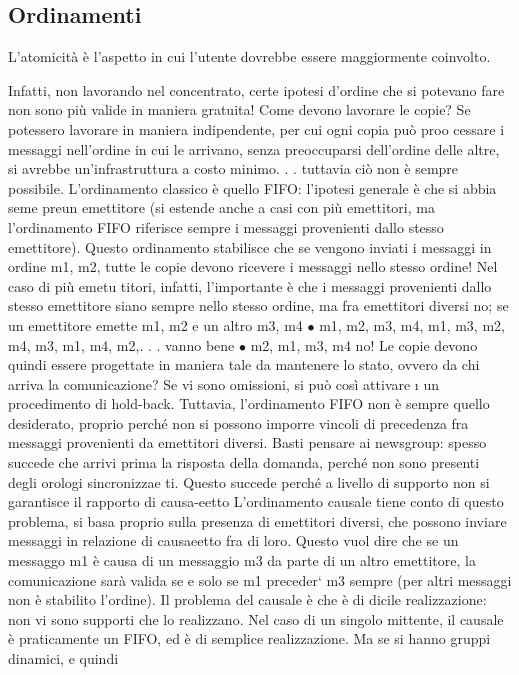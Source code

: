 \subsection{Ordinamenti}
L'atomicità è l'aspetto in cui l'utente dovrebbe essere maggiormente coinvolto.

Infatti, non lavorando nel concentrato, certe ipotesi d'ordine che si potevano
fare non sono più valide in maniera gratuita! Come devono lavorare le copie?
Se potessero lavorare in maniera indipendente, per cui ogni copia può proo
cessare i messaggi nell'ordine in cui le arrivano, senza preoccuparsi dell'ordine
delle altre, si avrebbe un'infrastruttura a costo minimo. . . tuttavia ciò non è
sempre possibile.
L'ordinamento classico è quello FIFO: l'ipotesi generale è che si abbia seme
preun emettitore (si estende anche a casi con più emettitori, ma l'ordinamento
FIFO riferisce sempre i messaggi provenienti dallo stesso emettitore). Questo
ordinamento stabilisce che se vengono inviati i messaggi in ordine m1, m2, tutte
le copie devono ricevere i messaggi nello stesso ordine! Nel caso di più emetu
titori, infatti, l'importante è che i messaggi provenienti dallo stesso emettitore
siano sempre nello stesso ordine, ma fra emettitori diversi no; se un emettitore
emette m1, m2 e un altro m3, m4
$\bullet$ m1, m2, m3, m4, m1, m3, m2, m4, m3, m1, m4, m2,. . . vanno bene
$\bullet$ m2, m1, m3, m4 no!
Le copie devono quindi essere progettate in maniera tale da mantenere lo stato,
ovvero da chi arriva la comunicazione? Se vi sono omissioni, si può così attivare
\i{}
un procedimento di hold-back.
Tuttavia, l'ordinamento FIFO non è sempre quello desiderato, proprio perché
non si possono imporre vincoli di precedenza fra messaggi provenienti da emettitori diversi. Basti pensare ai newsgroup:
spesso succede che arrivi prima
la risposta della domanda, perché non sono presenti degli orologi sincronizzae
ti. Questo succede perché a livello di supporto non si garantisce il rapporto di
causa-eetto
L'ordinamento causale tiene conto di questo problema, si basa proprio sulla
presenza di emettitori diversi, che possono inviare messaggi in relazione di causaeetto fra di loro. Questo vuol dire
che se un messaggo m1 è causa di un
messaggio m3 da parte di un altro emettitore, la comunicazione sarà valida se
e solo se m1 preceder` m3 sempre (per altri messaggi non è stabilito l'ordine).
Il problema del causale è che è di dicile realizzazione: non vi sono supporti
che lo realizzano. Nel caso di un singolo mittente, il causale è praticamente un
FIFO, ed è di semplice realizzazione. Ma se si hanno gruppi dinamici, e quindi
